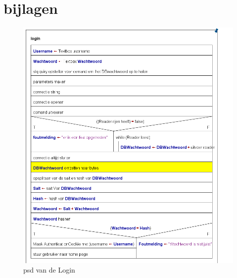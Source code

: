 \documentclass[11pt]{article}
\begin{document}
	\newpage
	
	\section{bijlagen}
	
	\begin{figure}[h]
		\includegraphics[scale=0.4]{Login}
		\caption{psd van de Login}
		\label{Login}
	\end{figure}
	\newpage
\end{document}
